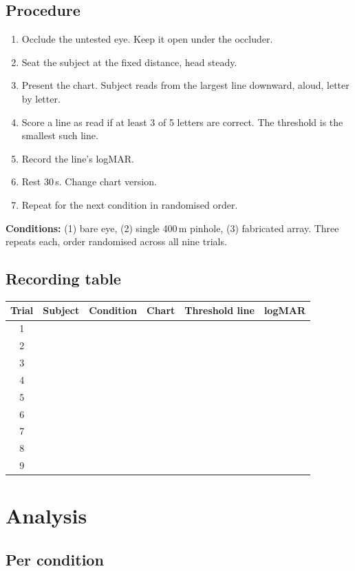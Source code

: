 \documentclass[11pt]{report}
\begin{document}
\section{Procedure}

\begin{enumerate}[leftmargin=1.2cm]
\item Occlude the untested eye. Keep it open under the occluder.
\item Seat the subject at the fixed distance, head steady.
\item Present the chart. Subject reads from the largest line downward, aloud, letter by letter.
\item Score a line as read if at least 3 of 5 letters are correct. The threshold is the smallest such line.
\item Record the line's logMAR.
\item Rest 30\,s. Change chart version.
\item Repeat for the next condition in randomised order.
\end{enumerate}

\textbf{Conditions:} (1) bare eye, (2) single 400\,\textmu m pinhole, (3) fabricated array.
Three repeats each, order randomised across all nine trials.

\section{Recording table}

\begin{longtable}{cccccc}
\toprule
Trial & Subject & Condition & Chart & Threshold line & logMAR \\
\midrule
\endhead
1 & & & & & \\
2 & & & & & \\
3 & & & & & \\
4 & & & & & \\
5 & & & & & \\
6 & & & & & \\
7 & & & & & \\
8 & & & & & \\
9 & & & & & \\
\bottomrule
\end{longtable}

\chapter{Analysis}

\section{Per condition}
\end{document}
